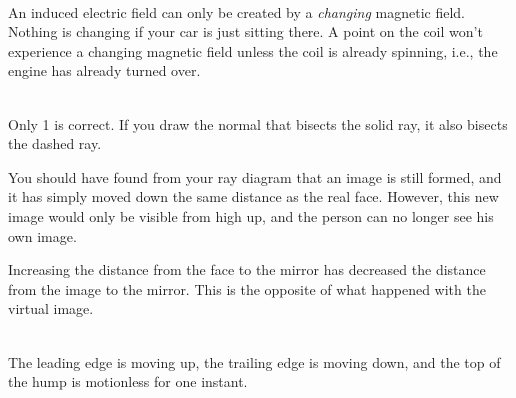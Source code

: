 
\noindent{}\\
An induced electric field can only be created by a \emph{changing} magnetic
field. Nothing is changing if your car is just sitting there. A point on the
coil won't experience a changing magnetic field unless the coil is already
spinning, i.e., the engine has already turned over.


\noindent{}\\
Only 1 is correct. If you draw the normal that bisects the solid ray, it
also bisects the dashed ray.


 You should have found from your ray diagram
that an image is still formed, and it has simply moved down the same distance
as the real face. However, this new image would only be visible from high up,
and the person can no longer see his own image. 

Increasing the distance from the face to the mirror has decreased the distance
from the image to the mirror. This is the opposite of what happened with the virtual
image.


\noindent{}\\
The leading edge is moving up, the trailing edge is moving down, and the top of the
hump is motionless for one instant.



